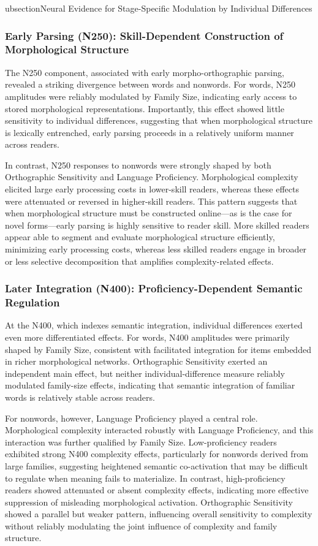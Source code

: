 \documentclass[utf8]{FrontiersinHarvard} %
\begin{document}
ubsection{Neural Evidence for Stage-Specific Modulation by Individual Differences}

\subsubsection{Early Parsing (N250): Skill-Dependent Construction of Morphological Structure}
The N250 component, associated with early morpho-orthographic parsing, revealed a striking divergence between words and nonwords. For words, N250 amplitudes were reliably modulated by Family Size, indicating early access to stored morphological representations. Importantly, this effect showed little sensitivity to individual differences, suggesting that when morphological structure is lexically entrenched, early parsing proceeds in a relatively uniform manner across readers.

In contrast, N250 responses to nonwords were strongly shaped by both Orthographic Sensitivity and Language Proficiency. Morphological complexity elicited large early processing costs in lower-skill readers, whereas these effects were attenuated or reversed in higher-skill readers. This pattern suggests that when morphological structure must be constructed online—as is the case for novel forms—early parsing is highly sensitive to reader skill. More skilled readers appear able to segment and evaluate morphological structure efficiently, minimizing early processing costs, whereas less skilled readers engage in broader or less selective decomposition that amplifies complexity-related effects.

\subsubsection{Later Integration (N400): Proficiency-Dependent Semantic Regulation}
At the N400, which indexes semantic integration, individual differences exerted even more differentiated effects. For words, N400 amplitudes were primarily shaped by Family Size, consistent with facilitated integration for items embedded in richer morphological networks. Orthographic Sensitivity exerted an independent main effect, but neither individual-difference measure reliably modulated family-size effects, indicating that semantic integration of familiar words is relatively stable across readers.

For nonwords, however, Language Proficiency played a central role. Morphological complexity interacted robustly with Language Proficiency, and this interaction was further qualified by Family Size. Low-proficiency readers exhibited strong N400 complexity effects, particularly for nonwords derived from large families, suggesting heightened semantic co-activation that may be difficult to regulate when meaning fails to materialize. In contrast, high-proficiency readers showed attenuated or absent complexity effects, indicating more effective suppression of misleading morphological activation. Orthographic Sensitivity showed a parallel but weaker pattern, influencing overall sensitivity to complexity without reliably modulating the joint influence of complexity and family structure.
\end{document}
